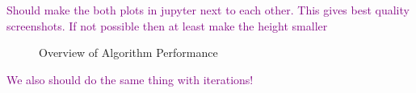 \textcolor{purple}{Should make the both plots in jupyter next to each other. This gives best quality screenshots. If not possible then at least make the height smaller}
\begin{figure}
    \centering
    \qquad
    \caption[Overview of Algorithm Performance]{Overview of Algorithm Performance}%
    \label{fig:AlgoPerformance}
\end{figure}

\textcolor{purple}{We also should do the same thing with iterations!}

